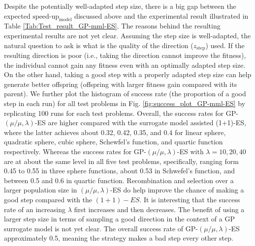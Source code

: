 Despite the potentially well-adapted step size, there is a big gap between the expected $\text{speed-up}_{\text{model}}$ discussed above and the experimental result illustrated in Table \ref{Tab:Test_result_GP-mml-ES}. The reasons behind the resulting experimental results are not yet clear. Assuming the step size is well-adapted, the natural question to ask is what is the quality of the direction ($z_{\text{step}}$) used. If the resulting direction is poor (i.e., taking the direction cannot improve the fitness), the individual cannot gain any fitness even with an optimally adapted step size. On the other hand, taking a good step with a properly adapted step size can help generate better offspring (offspring with larger fitness gain compared with its parent). We further plot the histogram of success rate (the proportion of a good step in each run) for all test problems in Fig. \ref{fig:success_plot_GP-mml-ES} by replicating 100 runs for each test problems. Overall, the success rates for GP-$(\mu/\mu,\lambda)$-ES are higher compared with the surrogate model assisted (1+1)-ES, where the latter achieves about 0.32, 0.42, 0.35, and 0.4 for linear sphere, quadratic sphere, cubic sphere, Schewfel's function, and quartic function respectively. Whereas the success rates for GP-$(\mu/\mu,\lambda)$-ES with $\lambda=10,20,40$ are at about the same level in all five test problems, specifically, ranging form 0.45 to 0.55 in three sphere functions, about 0.53 in Schwefel's function, and between 0.5 and 0.6 in quartic function. Recombination and selection over a larger population size in $(\mu/\mu,\lambda)$-ES do help improve the chance of making a good step compared with the $(1+1)-ES$. It is interesting that the success rate of an increasing $\lambda$ first increases and then decreases. The benefit of using a larger step size in terms of sampling a good direction in the context of a GP surrogate model is not yet clear. The overall success rate {}of GP-$(\mu/\mu,\lambda)$-ES approximately 0.5, meaning the strategy makes a bad step every other step. 





